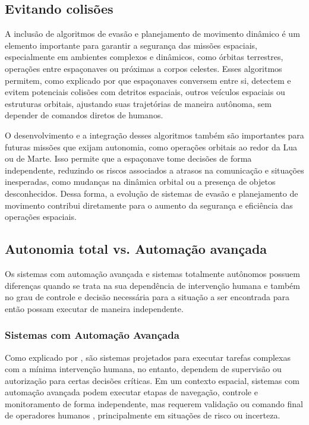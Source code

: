\subsection{Evitando colisões}

A inclusão de algoritmos de evasão e planejamento de movimento dinâmico é um elemento importante para garantir a segurança das missões espaciais, especialmente em ambientes complexos e dinâmicos, como órbitas terrestres, operações entre espaçonaves ou próximas a corpos celestes. Esses algoritmos permitem, como explicado por \cite{newman2024} que espaçonaves conversem entre si, detectem e evitem potenciais colisões com detritos espaciais, outros veículos espaciais ou estruturas orbitais, ajustando suas trajetórias de maneira autônoma, sem depender de comandos diretos de humanos.

O desenvolvimento e a integração desses algoritmos também são importantes para futuras missões que exijam autonomia, como operações orbitais ao redor da Lua ou de Marte. Isso permite que a espaçonave tome decisões de forma independente, reduzindo os riscos associados a atrasos na comunicação e situações inesperadas, como mudanças na dinâmica orbital ou a presença de objetos desconhecidos. Dessa forma, a evolução de sistemas de evasão e planejamento de movimento contribui diretamente para o aumento da segurança e eficiência das operações espaciais.

\subsection{Autonomia total vs. Automação avançada}

Os sistemas com automação avançada e sistemas totalmente autônomos possuem diferenças quando se trata na sua dependência de intervenção humana e também no grau de controle e decisão necessária para a situação a ser encontrada para então possam executar de maneira independente.

\subsubsection{Sistemas com Automação Avançada}

Como explicado por \cite{ibmAutomation}, são sistemas projetados para executar tarefas complexas com a mínima intervenção humana, no entanto, dependem de supervisão ou autorização para certas decisões críticas. Em um contexto espacial, sistemas com automação avançada podem executar etapas de navegação, controle e monitoramento de forma independente, mas requerem validação ou comando final de operadores humanos \cite{nasaNAC2018}, principalmente em situações de risco ou incerteza.

